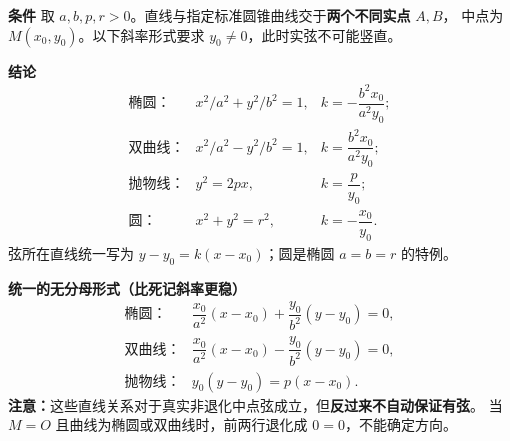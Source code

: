 \begin{statementbox}
\textbf{\textcolor{CStatement}{条件}}
取 $a,b,p,r>0$。直线与指定标准圆锥曲线交于\textbf{两个不同实点} $A,B$，
中点为 $M(x_0,y_0)$。以下斜率形式要求 $y_0\ne0$，此时实弦不可能竖直。
\begin{center}\end{center}

\medskip
\textbf{\textcolor{CStatement}{结论}}
\[
\begin{array}{lll}
\text{椭圆：}&x^2/a^2+y^2/b^2=1,&\boxed{k=-\dfrac{b^2x_0}{a^2y_0}};\\[7pt]
\text{双曲线：}&x^2/a^2-y^2/b^2=1,&\boxed{k=\dfrac{b^2x_0}{a^2y_0}};\\[7pt]
\text{抛物线：}&y^2=2px,&\boxed{k=\dfrac{p}{y_0}};\\[7pt]
\text{圆：}&x^2+y^2=r^2,&\boxed{k=-\dfrac{x_0}{y_0}}.
\end{array}
\]
弦所在直线统一写为 $\boxed{y-y_0=k(x-x_0)}$；圆是椭圆 $a=b=r$ 的特例。

\end{statementbox}
\clearpage
\begin{statementbox}

\textbf{\textcolor{CStatement}{统一的无分母形式（比死记斜率更稳）}}
\[
\begin{array}{ll}
\text{椭圆：}&\dfrac{x_0}{a^2}(x-x_0)+\dfrac{y_0}{b^2}(y-y_0)=0,\\[5pt]
\text{双曲线：}&\dfrac{x_0}{a^2}(x-x_0)-\dfrac{y_0}{b^2}(y-y_0)=0,\\[5pt]
\text{抛物线：}&y_0(y-y_0)=p(x-x_0).
\end{array}
\]
\textbf{注意：}这些直线关系对于真实非退化中点弦成立，但\textbf{反过来不自动保证有弦}。
当 $M=O$ 且曲线为椭圆或双曲线时，前两行退化成 $0=0$，不能确定方向。
\begin{center}\end{center}
\end{statementbox}
